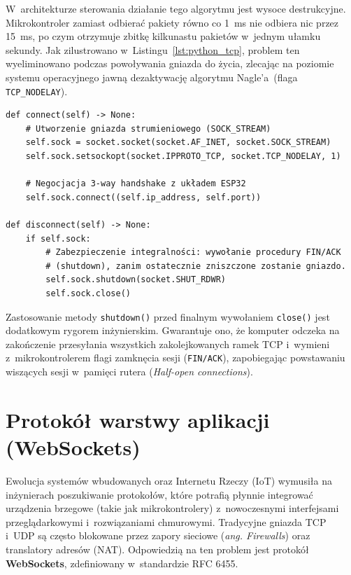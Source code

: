 W~architekturze sterowania działanie tego algorytmu jest wysoce destrukcyjne.
Mikrokontroler zamiast odbierać pakiety równo co 1~ms nie odbiera nic przez 15~ms, po czym otrzymuje zbitkę kilkunastu pakietów w~jednym ułamku sekundy.
Jak zilustrowano w~Listingu~\ref{lst:python_tcp}, problem ten wyeliminowano podczas powoływania gniazda do życia, zlecając na poziomie systemu operacyjnego jawną dezaktywację algorytmu Nagle'a~(flaga \texttt{TCP\_NODELAY}).

\begin{listing}[htbp]
    \caption{Konfiguracja strumieniowego gniazda TCP z~dezaktywacją algorytmu Nagle'a~i~zabezpieczeniem transakcyjnym (\texttt{tcp\_dp.py}) \cite{espy_nexus_python_host}.}
    \label{lst:python_tcp}
    \begin{verbatim}
def connect(self) -> None:
    # Utworzenie gniazda strumieniowego (SOCK_STREAM)
    self.sock = socket.socket(socket.AF_INET, socket.SOCK_STREAM)
    self.sock.setsockopt(socket.IPPROTO_TCP, socket.TCP_NODELAY, 1)

    # Negocjacja 3-way handshake z układem ESP32
    self.sock.connect((self.ip_address, self.port))

def disconnect(self) -> None:
    if self.sock:
        # Zabezpieczenie integralności: wywołanie procedury FIN/ACK 
        # (shutdown), zanim ostatecznie zniszczone zostanie gniazdo.
        self.sock.shutdown(socket.SHUT_RDWR)
        self.sock.close()
\end{verbatim}
\end{listing}

Zastosowanie metody \texttt{shutdown()} przed finalnym wywołaniem \texttt{close()} jest dodatkowym rygorem inżynierskim.
Gwarantuje ono, że komputer odczeka na zakończenie przesyłania wszystkich zakolejkowanych ramek TCP i~wymieni z~mikrokontrolerem flagi zamknęcia sesji (\texttt{FIN/ACK}), zapobiegając powstawaniu wiszących sesji w~pamięci rutera (\textit{Half-open connections}).

\section{Protokół warstwy aplikacji (WebSockets)}
\label{sec:protokol_websockets}

Ewolucja systemów wbudowanych oraz Internetu Rzeczy (IoT) wymusiła na inżynierach poszukiwanie protokołów, które potrafią płynnie integrować urządzenia brzegowe (takie jak mikrokontrolery) z~nowoczesnymi interfejsami przeglądarkowymi i~rozwiązaniami chmurowymi.
Tradycyjne gniazda TCP i~UDP są często blokowane przez zapory sieciowe (\textit{ang. Firewalls}) oraz translatory adresów (NAT).
Odpowiedzią na ten problem jest protokół \textbf{WebSockets}, zdefiniowany w~standardzie RFC 6455.


